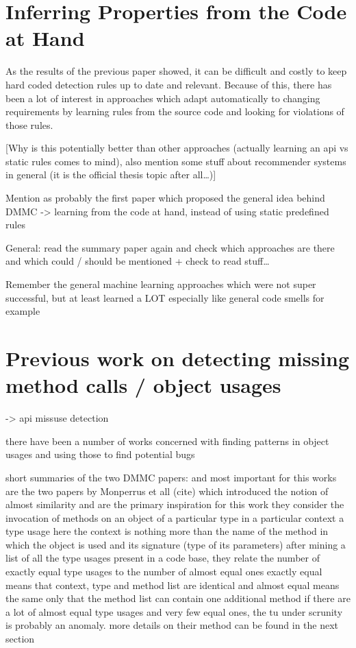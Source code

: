 \section{Inferring Properties from the Code at Hand}

As the results of the previous paper showed, it can be difficult and costly to keep hard coded detection rules up to date and relevant.
Because of this, there has been a lot of interest in approaches which adapt automatically to changing requirements by learning rules from the source code and looking for violations of those rules.

[Why is this potentially better than other approaches (actually learning an api vs static rules comes to mind),
also mention some stuff about recommender systems in general (it is the official thesis topic after all\ldots)]

Mention \cite{engler2001bugs} as probably the first paper which proposed the general idea behind DMMC -> learning from the code at hand, instead of using static predefined rules

General: read the summary paper \cite{robillard2013automated} again and check which approaches are there and which could / should be mentioned
+ check to read stuff\ldots

Remember the general machine learning approaches which were not super successful, but at least learned a LOT
especially like general code smells for example

\section{Previous work on detecting missing method calls / object usages}
-> api missuse detection

there have been a number of works concerned with finding patterns in object usages and using those to find potential bugs

short summaries of the two DMMC papers: \cite{monperrus2010detecting} and \cite{monperrus2013detecting}
most important for this works are the two papers by Monperrus et all (cite)
which introduced the notion of almost similarity and are the primary inspiration for this work
they consider the invocation of methods on an object of a particular type in a particular context a type usage
here the context is nothing more than the name of the method in which the object is used and its signature (type of its parameters)
after mining a list of all the type usages present in a code base, they relate the number of exactly equal type usages to the number of almost equal ones
exactly equal means that context, type and method list are identical and almost equal means the same only that the method list can contain one additional method
if there are a lot of almost equal type usages and very few equal ones, the tu under scrunity is probably an anomaly.
more details on their method can be found in the next section


